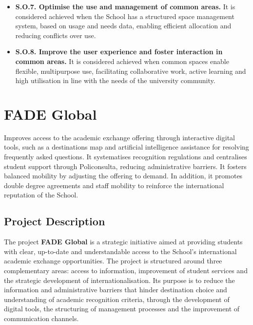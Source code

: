 \documentclass[11pt,a4paper]{scrreprt}
\begin{document}
\begin{itemize}
\item \textbf{S.O.7. Optimise the use and management of common areas.}  
It is considered achieved when the School has a structured space management system, based on usage and needs data, enabling efficient allocation and reducing conflicts over use.

\item \textbf{S.O.8. Improve the user experience and foster interaction in common areas.}  
It is considered achieved when common spaces enable flexible, multipurpose use, facilitating collaborative work, active learning and high utilisation in line with the needs of the university community.

\end{itemize}
\clearpage

\chapter[FADE Global]{\textcolor{fgcolor}{FADE Global}}
\begin{tcolorbox}[descbox]
\small Improves access to the academic exchange offering through interactive digital tools, such as a destinations map and artificial intelligence assistance for resolving frequently asked questions. It systematises recognition regulations and centralises student support through Policonsulta, reducing administrative barriers. It fosters balanced mobility by adjusting the offering to demand. In addition, it promotes double degree agreements and staff mobility to reinforce the international reputation of the School.
\end{tcolorbox}

\section{Project Description}

\small
The project \textbf{FADE Global} is a strategic initiative aimed at providing students with clear, up-to-date and understandable access to the School's international academic exchange opportunities. The project is structured around three complementary areas: access to information, improvement of student services and the strategic development of internationalisation. Its purpose is to reduce the information and administrative barriers that hinder destination choice and understanding of academic recognition criteria, through the development of digital tools, the structuring of management processes and the improvement of communication channels.
\end{document}

